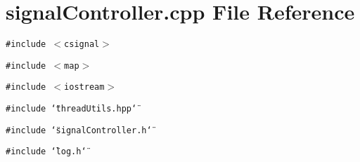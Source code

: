 \section{signal\-Controller.cpp File Reference}
\label{signalController_8cpp}
{\tt \#include $<$csignal$>$}\par
{\tt \#include $<$map$>$}\par
{\tt \#include $<$iostream$>$}\par
{\tt \#include \char`\"{}thread\-Utils.hpp\char`\"{}}\par
{\tt \#include \char`\"{}signal\-Controller.h\char`\"{}}\par
{\tt \#include \char`\"{}log.h\char`\"{}}\par
